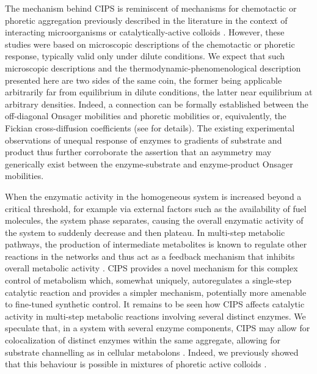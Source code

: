 The mechanism behind CIPS is reminiscent of mechanisms for chemotactic or phoretic aggregation previously described in the literature in the context of interacting microorganisms or catalytically-active colloids \cite{saha2014clusters,golestanian2019phoretic,agudo-canalejoActivePhaseSeparation2019,keller1970initiation}. However, these studies were based on microscopic descriptions of the chemotactic or phoretic response, typically valid only under dilute conditions. We expect that such microscopic descriptions and the thermodynamic-phenomenological description presented here are two sides of the same coin, the former being applicable arbitrarily far from equilibrium in dilute conditions, the latter near equilibrium at arbitrary densities.
Indeed, a connection can be formally established between the off-diagonal Onsager mobilities and phoretic mobilities \cite{golestanian2019phoretic,anderson1989colloid} or, equivalently, the Fickian cross-diffusion coefficients \cite{vanag2009cross} (see \cite{suppmat} for details). The existing experimental observations \cite{agudo2018enhanced,zhang2021chemically} of unequal response of enzymes to gradients of substrate and product thus further corroborate the assertion that an asymmetry may generically exist between the enzyme-substrate and enzyme-product Onsager mobilities.





When the enzymatic activity in the homogeneous system is increased beyond a critical threshold, for example via external factors such as the availability of fuel molecules, the system phase separates, causing the overall enzymatic activity of the system to suddenly decrease and then plateau.
In multi-step metabolic pathways, the production of intermediate metabolites is known to regulate other reactions in the networks and thus act as a feedback mechanism that inhibits overall metabolic activity \cite{o2012dynamic,alam2017self}. CIPS provides a novel mechanism for this complex control of metabolism which, somewhat uniquely, autoregulates a single-step catalytic reaction and provides a simpler mechanism, potentially more amenable to fine-tuned synthetic control.
It remains to be seen how CIPS affects catalytic activity in multi-step metabolic reactions involving several distinct enzymes. We speculate that, in a system with several enzyme components, CIPS may allow for colocalization of distinct enzymes within the same aggregate, allowing for substrate channelling as in cellular metabolons \cite{poshyvailoDoesMetaboliteChanneling2017,sweetloveRoleDynamicEnzyme2018}. Indeed, we previously showed that this behaviour is possible in mixtures of phoretic active colloids \cite{agudo-canalejoActivePhaseSeparation2019}.

